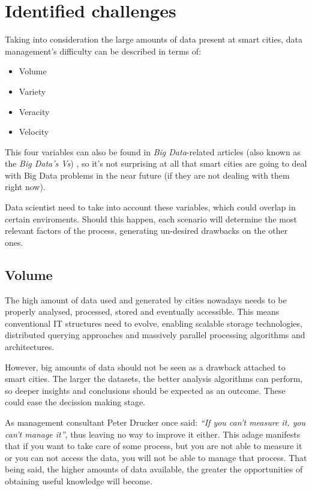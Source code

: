 \section{Identified challenges}

Taking into consideration the large amounts of data present at smart cities, data management's difficulty can be described in terms of:
\begin{itemize}
	\item Volume
	\item Variety
	\item Veracity
	\item Velocity
\end{itemize}

This four variables can also be found in \textit{Big Data}-related articles (also known as the \textit{Big Data's Vs}) \cite{zikopoulos2011understanding,russom2011big}, so it's not surprising at all that smart cities are going to deal with Big Data problems in the near future (if they are not dealing with them right now).

Data scientist need to take into account these variables, which could overlap in certain enviroments. Should this happen, each scenario will determine the most relevant factors of the process, generating un-desired drawbacks on the other ones.

\subsection{Volume}

The high amount of data used and generated by cities nowadays needs to be properly analysed, processed, stored and eventually accessible. This means conventional IT structures need to evolve, enabling scalable storage technologies, distributed querying approaches and massively parallel processing algorithms and architectures.


However, big amounts of data should not be seen as a drawback attached to smart cities. The larger the datasets, the better analysis algorithms can perform, so deeper insights and conclusions should be expected as an outcome. These could ease the decission making stage.

As management consultant Peter Drucker once said: \textit{``If you can't measure it, you can't manage it''}, thus leaving no way to improve it either. This adage manifests that if you want to take care of some process, but you are not able to measure it or you can not access the data, you will not be able to manage that process. That being said, the higher amounts of data available, the greater the opportunities of obtaining useful knowledge will become.

